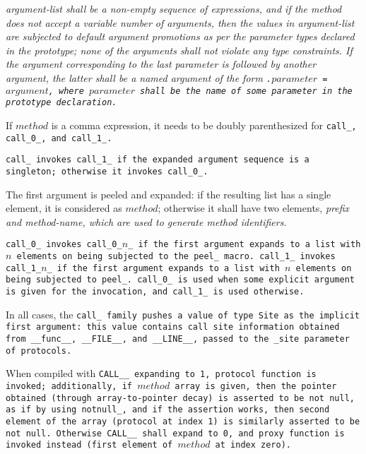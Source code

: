 \it{argument-list} shall be a non-empty sequence of expressions,
and if the method does not accept a variable number of arguments,
then the values in \it{argument-list} are subjected to default argument
promotions as per the parameter types declared in the prototype;
none of the arguments shall not violate any type constraints.
If the argument corresponding to the last parameter is followed
by another argument, the latter shall be a named argument of the
form \tt{.}$parameter$ \tt{=} $argument$, where $parameter$ shall
be the name of some parameter in the prototype declaration.

\note If $method$ is a comma expression, it needs to be doubly
parenthesized for \tt{call_}, \tt{call_0_}, and \tt{call_1_}.


\tt{call_} invokes \tt{call_1_} if the expanded argument
sequence is a singleton; otherwise it invokes \tt{call_0_}.

The first argument is peeled and expanded: if the resulting list has a single
element, it is considered as $method$; otherwise it shall have two elements,
\it{prefix} and \it{method-name}, which are used to generate method identifiers.

\tt{call_0_} invokes \tt{call_0_}$n$\_ if the first argument expands
to a list with $n$ elements on being subjected to the \tt{peel_} macro.
\tt{call_1_} invokes \tt{call_1_}$n$\_ if the first argument
expands to a list with $n$ elements on being subjected to \tt{peel_}.
\tt{call_0_} is used when some explicit argument is given
for the invocation, and \tt{call_1_} is used otherwise.

In all cases, the \tt{call_} family pushes a value of type \tt{Site}
as the implicit first argument: this value contains call site
information obtained from \tt{__func__}, \tt{__FILE__}, and
\tt{__LINE__}, passed to the \tt{_site} parameter of protocols.

When compiled with \tt{CALL__} expanding to \tt{1}, protocol function is
invoked; additionally, if $method$ array is given, then the pointer obtained
(through array-to-pointer decay) is asserted to be not null, as if by using
\tt{notnull_}, and if the assertion works, then second element of the array
(protocol at index \tt{1}) is similarly asserted to be not null.
Otherwise \tt{CALL__} shall expand to \tt{0}, and proxy function
is invoked instead (first element of $method$ at index zero).


